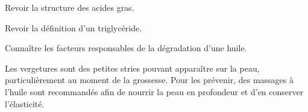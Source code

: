 \teteTermStssAlim
\vspace*{-36pt}
\vspace*{-12pt}

\begin{objectifs}
  \item Revoir la structure des acides gras.
  \item Revoir la définition d'un triglycéride.
  \item Connaître les facteurs responsables de la dégradation d'une huile.
\end{objectifs}

\begin{contexte}
  Les vergetures sont des petites stries pouvant apparaître sur la peau, particulièrement au moment de la grossesse. 
  Pour les prévenir, des massages à l’huile sont recommandés afin de nourrir la peau en profondeur et d’en conserver l’élasticité.
  
\end{contexte}


